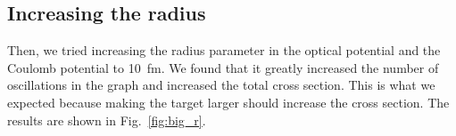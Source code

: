 \documentclass[aps, prc, twocolumn, reprint]{revtex4-1}
\newcommand{\fresco}[0]{\textsc{Fresco}\xspace}
\begin{document}

	\subsection{Increasing the radius}

	Then, we tried increasing the radius parameter in the optical potential and the Coulomb potential to \SI{10}{fm}. We found that it greatly increased the number of oscillations in the graph and increased the total cross section. This is what we expected because making the target larger should increase the cross section. The results are shown in Fig.~\ref{fig:big_r}.
\end{document}
